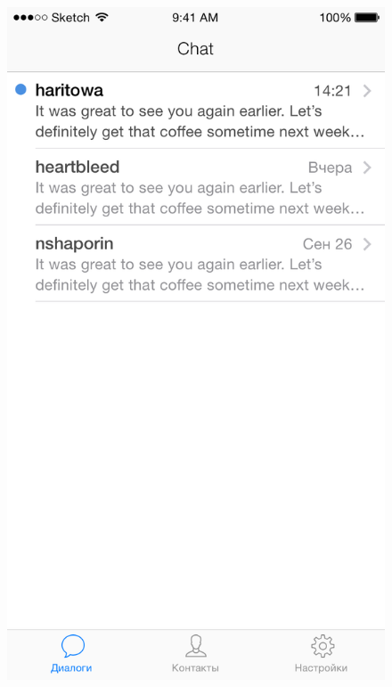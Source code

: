 \begin{figure}[H]
\centering
\begin{minipage}{.5\textwidth}
  \centering
  \includegraphics[height=0.25\textheight]{inc/img/ui/dialogues_unread.png}
  \label{sec:usage:dialogues:list}
\end{minipage}%
\begin{minipage}{.5\textwidth}
  \centering

\end{minipage}
\end{figure}
